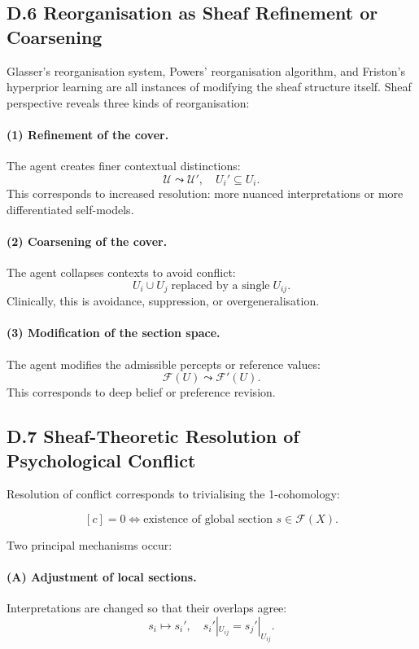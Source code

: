 \documentclass[11pt,a4paper,twoside]{article}
\begin{document}
\subsection*{D.6 Reorganisation as Sheaf Refinement or Coarsening}

Glasser’s reorganisation system, Powers’ reorganisation algorithm, and Friston’s hyperprior learning are all instances of modifying the sheaf structure itself. Sheaf perspective reveals three kinds of reorganisation:

\paragraph{(1) Refinement of the cover.}
The agent creates finer contextual distinctions:
\[
\mathcal{U} \leadsto \mathcal{U}',
\quad
U_i' \subseteq U_i.
\]
This corresponds to increased resolution: more nuanced interpretations or more differentiated self-models.

\paragraph{(2) Coarsening of the cover.}
The agent collapses contexts to avoid conflict:
\[
U_i \cup U_j \;\text{replaced by a single}\; U_{ij}.
\]
Clinically, this is avoidance, suppression, or overgeneralisation.

\paragraph{(3) Modification of the section space.}
The agent modifies the admissible percepts or reference values:
\[
\mathscr{F}(U) \leadsto \mathscr{F}'(U).
\]
This corresponds to deep belief or preference revision.

\subsection*{D.7 Sheaf-Theoretic Resolution of Psychological Conflict}

Resolution of conflict corresponds to trivialising the 1-cohomology:

\[
[c] = 0 \iff \text{existence of global section } s \in \mathscr{F}(X).
\]

Two principal mechanisms occur:

\paragraph{(A) Adjustment of local sections.}
Interpretations are changed so that their overlaps agree:
\[
s_i \mapsto s_i', \quad s_i'|_{U_{ij}} = s_j'|_{U_{ij}}.
\]
\end{document}

